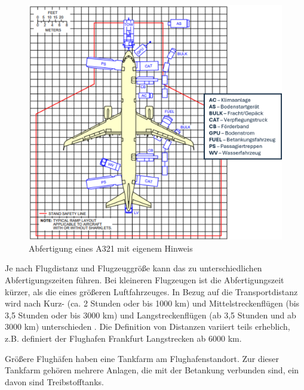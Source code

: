 \begin{figure}[h]
	\centering
	\includegraphics[width=0.8\linewidth]{Bilder/A321_Abfertigung.png}
	\caption[Abfertigung eines Flugzeugs an der Parkposition]{Abfertigung eines A321 \cite{airbus2022a321} mit eigenem Hinweis}
	\label{abfertigung}
\end{figure}

Je nach Flugdistanz und Flugzeuggröße kann das zu unterschiedlichen Abfertigungszeiten führen. 
Bei kleineren Flugzeugen ist die Abfertigungszeit kürzer, als die eines größeren Luftfahrzeuges. 
In Bezug auf die Transportdistanz wird nach Kurz- (ca. 2 Stunden oder bis 1000 km) 
und Mittelstreckenflügen (bis 3,5 Stunden oder bis 3000 km) und 
Langstreckenflügen (ab 3,5 Stunden und ab 3000 km) unterschieden \cite{mensen2013handbuch}.
Die Definition von Distanzen variiert teils erheblich, 
z.B. definiert der Flughafen Frankfurt Langstrecken ab 6000 km.%


Größere Flughäfen haben eine Tankfarm am Flughafenstandort. 
Zur dieser Tankfarm gehören mehrere Anlagen, die mit der Betankung verbunden sind, 
ein davon sind Treibstofftanks.
